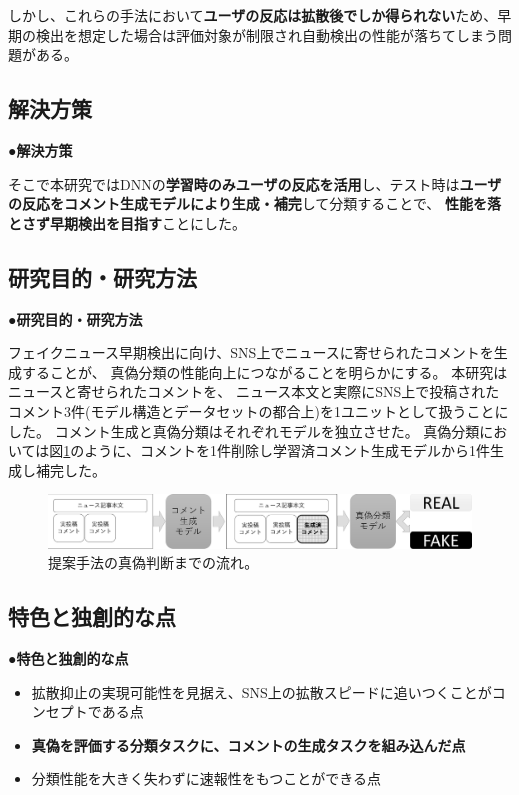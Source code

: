 {	しかし、これらの手法において\textbf{ユーザの反応は拡散後でしか得られない}ため、早期の検出を想定した場合は評価対象が制限され自動検出の性能が落ちてしまう問題がある。

	\subsection{解決方策}
	\noindent
	●\textbf{解決方策}

	そこで本研究ではDNNの\textbf{学習時のみユーザの反応を活用}し、テスト時は\textbf{ユーザの反応をコメント生成モデルにより生成・補完}して分類することで、
	\textbf{性能を落とさず早期検出を目指す}ことにした。

	\subsection{研究目的・研究方法}
	\noindent
	●\textbf{研究目的・研究方法}

	フェイクニュース早期検出に向け、SNS上でニュースに寄せられたコメントを生成することが、
	真偽分類の性能向上につながることを明らかにする。
	本研究はニュースと寄せられたコメントを、
	ニュース本文と実際にSNS上で投稿されたコメント3件(モデル構造とデータセットの都合上)を1ユニットとして扱うことにした。
	コメント生成と真偽分類はそれぞれモデルを独立させた。
	真偽分類においては図\ref{fig:model}のように、コメントを1件削除し学習済コメント生成モデルから1件生成し補完した。
	
	\begin{figure}[ht]
		\centering
		\includegraphics[width=0.95\linewidth]{figs/model.pdf}
		\vspace*{-3mm}
		\caption{提案手法の真偽判断までの流れ。}
		\label{fig:model}
	\end{figure}
	\vspace*{-4mm}
	\subsection{特色と独創的な点}
	\noindent
	●\textbf{特色と独創的な点}
	\vspace*{-3mm}
	\begin{itemize}
		\setlength{\parskip}{0cm}
		\setlength{\itemsep}{0cm}
		\item 拡散抑止の実現可能性を見据え、SNS上の拡散スピードに追いつくことがコンセプトである点
		\item \textbf{真偽を評価する分類タスクに、コメントの生成タスクを組み込んだ点}
		\item 分類性能を大きく失わずに速報性をもつことができる点
	\end{itemize}
	\vspace*{-2mm}

}
